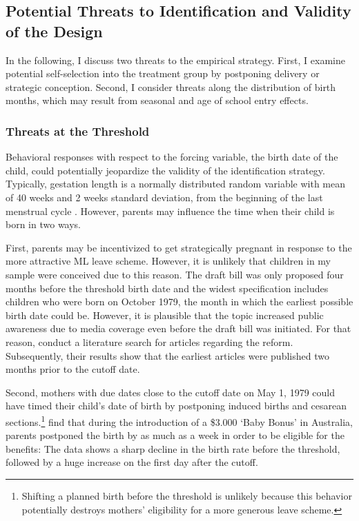





\bigskip
\subsection{Potential Threats to Identification and Validity of the Design}\label{sec_mlch:empirical_strategy_threats+validity}

In the following, I discuss two threats to the empirical strategy. First, I examine potential self-selection into the treatment group by postponing delivery or strategic conception. Second, I consider threats along the distribution of birth months, which may result from seasonal and age of school entry effects.

\subsubsection{Threats at the Threshold}
Behavioral responses with respect to the forcing variable, the birth date of the child, could potentially jeopardize the validity of the identification strategy. Typically, gestation length is a normally distributed random variable with mean of 40 weeks and 2 weeks standard deviation, from the beginning of the last menstrual cycle \citep{Ekberg2013parental}. However, parents may influence the time when their child is born in two ways. 

First, parents may be incentivized to get strategically pregnant in response to the more attractive ML leave scheme. However, it is unlikely that children in my sample were conceived due to this reason. The draft bill was only proposed four months before the threshold birth date and the widest specification includes children who were born on October 1979, the month in which the earliest possible birth date could be. However, it is plausible that the topic increased public awareness due to media coverage even before the draft bill was initiated. For that reason, \cite{Dustmann2012} conduct a literature search for articles regarding the reform. Subsequently, their results show that the earliest articles were published two months prior to the cutoff date.

Second, mothers with due dates close to the cutoff date on May 1, 1979 could have timed their child's date of birth by postponing induced births and cesarean sections.\footnote{Shifting a planned birth before the threshold is unlikely because this behavior potentially destroys mothers' eligibility for a more generous leave scheme.} \cite{gans2009born} find that during the introduction of a \$3.000 `Baby Bonus' in Australia, parents postponed the birth by as much as a week in order to be eligible for the benefits: The data shows a sharp decline in the birth rate before the threshold, followed by a huge increase on the first day after the cutoff.

